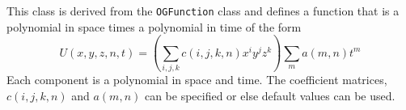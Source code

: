 This class is derived from the {\tt OGFunction} class and defines a function
that is a polynomial in space times a polynomial in time of the form
$$
U(x,y,z,n,t) = ( \sum_{i,j,k} c(i,j,k,n) x^i y^j z^k ) \sum_m a(m,n) t^m
$$
Each component is a polynomial in space and time.
The coefficient matrices, $c(i,j,k,n)$ and $a(m,n)$ can be specified or else
default values can be used.




\vfill\eject 
\subsection{}
 


% 
% 
% 
% 
% 




